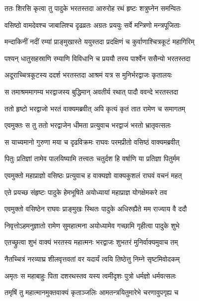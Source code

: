 
\twolineshloka
{ततः शिरसि कृत्वा तु पादुके भरतस्तदा}
{आरुरोह रथं हृष्टः शत्रुघ्नेन समन्वितः} %

\twolineshloka
{वसिष्ठो वामदेवश्च जाबालिश्च दृढव्रतः}
{अग्रतः प्रययुः सर्वे मन्त्रिणो मन्त्रपूजिताः} %

\twolineshloka
{मन्दाकिनीं नदीं रम्यां प्राङ्मुखास्ते ययुस्तदा}
{प्रदक्षिणं च कुर्वाणाश्चित्रकूटं महागिरिम्} %

\twolineshloka
{पश्यन् धातुसहस्राणि रम्याणि विविधानि च}
{प्रययौ तस्य पार्श्वेन ससैन्यो भरतस्तदा} %

\twolineshloka
{अदूराच्चित्रकूटस्य ददर्श भरतस्तदा}
{आश्रमं यत्र स मुनिर्भरद्वाजः कृतालयः} %

\twolineshloka
{स तमाश्रममागम्य भरद्वाजस्य बुद्धिमान्}
{अवतीर्य रथात् पादौ ववन्दे भरतस्तदा} %

\twolineshloka
{ततो हृष्टो भरद्वाजो भरतं वाक्यमब्रवीत्}
{अपि कृत्यं कृतं तात रामेण च समागतम्} %

\twolineshloka
{एवमुक्तः स तु ततो भरद्वाजेन धीमता}
{प्रत्युवाच भरद्वाजं भरतो भ्रातृवत्सलः} %

\twolineshloka
{स याच्यमानो गुरुणा मया च दृढविक्रमः}
{राघवः परमप्रीतो वसिष्ठं वाक्यमब्रवीत्} %

\twolineshloka
{पितुः प्रतिज्ञां तामेव पालयिष्यामि तत्त्वतः}
{चतुर्दश हि वर्षाणि या प्रतिज्ञा पितुर्मम} %

\twolineshloka
{एवमुक्तो महाप्राज्ञो वसिष्ठः प्रत्युवाच ह}
{वाक्यज्ञो वाक्यकुशलं राघवं वचनं महत्} %

\twolineshloka
{एते प्रयच्छ संहृष्टः पादुके हेमभूषिते}
{अयोध्यायां महाप्राज्ञ योगक्षेमकरे तव} %

\twolineshloka
{एवमुक्तो वसिष्ठेन राघवः प्राङ्मुखः स्थितः}
{पादुके अधिरुह्यैते मम राज्याय वै ददौ} %

\twolineshloka
{निवृत्तोऽहमनुज्ञातो रामेण सुमहात्मना}
{अयोध्यामेव गच्छामि गृहीत्वा पादुके शुभे} %

\twolineshloka
{एतच्छ्रुत्वा शुभं वाक्यं भरतस्य महात्मनः}
{भरद्वाजः शुभतरं मुनिर्वाक्यमुवाच तम्} %

\twolineshloka
{नैतच्चित्रं नरव्याघ्र शीलवृत्तवतां वर}
{यदार्यं त्वयि तिष्ठेत्तु निम्ने सृष्टमिवोदकम्} %

\twolineshloka
{अमृतः स महाबाहुः पिता दशरथस्तव}
{यस्य त्वमीदृशः पुत्रो धर्मज्ञो धर्मवत्सलः} %

\twolineshloka
{तमृषिं तु महात्मानमुक्तवाक्यं कृताञ्जलिः}
{आमतन्त्रयितुमारेभे चरणावुपगृह्य च} %

